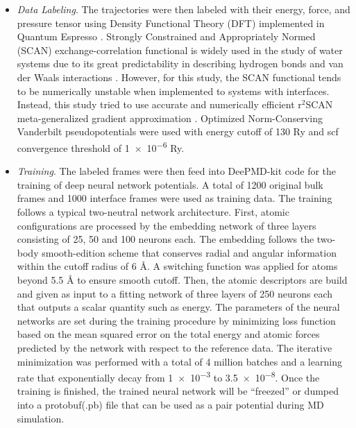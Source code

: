 \begin{itemize}
    \item \emph{Data Labeling}.
          The trajectories were then labeled with their energy, force, and
          pressure
          tensor using Density Functional Theory (DFT) implemented in Quantum
          Espresso
          \cite{QE-2009,QE-2017,QE-2020}. Strongly Constrained and
          Appropriately
          Normed
          (SCAN) exchange-correlation functional is widely used in the study of
          water
          systems due to its great predictability in describing hydrogen bonds
          and
          van
          der Waals interactions \cite{sun2015strongly, chen2017ab}. However,
          for
          this
          study, the SCAN functional tends to be numerically unstable when
          implemented
          to systems with interfaces. Instead, this study tried to use accurate
          and
          numerically efficient r$^2$SCAN meta-generalized gradient
          approximation
          \cite{Furness2020}. Optimized Norm-Conserving Vanderbilt
          pseudopotentials
          \cite{hamann2013optimized} were used with energy cutoff of 130 Ry and
          scf
          convergence threshold of \num{1e-6} Ry.

    \item \emph{Training}. The labeled frames were then feed into DeePMD-kit
          code
          \cite{wang2018deepmd,zeng2023deepmd,lu2021,zhang2018end} for the
          training
          of
          deep neural network potentials. A total of 1200 original bulk frames
          and 1000
          interface
          frames were used as training data. The training follows a typical
          two-neutral
          network architecture. First, atomic configurations are processed by
          the
          embedding network of three layers consisting of 25, 50 and 100
          neurons
          each.
          The embedding follows the two-body smooth-edition scheme
          \cite{NEURIPS2018}
          that conserves radial and angular information within the cutoff
          radius of 6
          \r{A}. A switching function was applied for atoms beyond 5.5 \r{A} to
          ensure
          smooth cutoff.	Then, the atomic descriptors are build and
          given as
          input to a
          fitting network of three layers of 250 neurons each that outputs a
          scalar
          quantity such as energy. The parameters of the neural networks are
          set
          during
          the training procedure by minimizing	loss function based on the mean
          squared
          error on the total energy and atomic forces predicted
          by the network with respect to the reference data. The iterative
          minimization
          was performed with a total of 4 million batches and a learning rate
          that
          exponentially decay from \num{1e-3} to \num{3.5e-8}. Once the
          training is finished, the trained neural network will be  ``freezed''
          or dumped into a protobuf(.pb) file that can be used as a pair
          potential during MD simulation.


\end{itemize}
